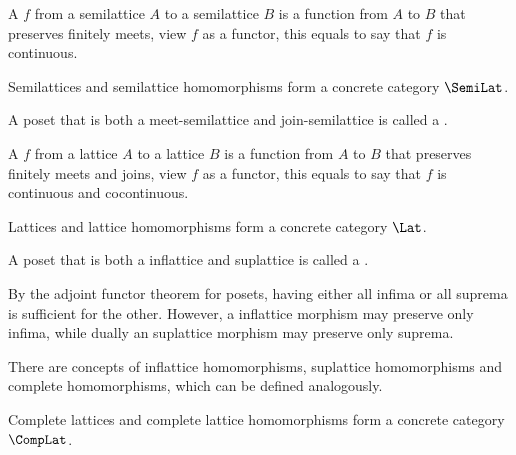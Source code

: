  A  $f$ from a semilattice $A$ to a semilattice $B$ is a function from $A$ to $B$ that preserves finitely meets, view $f$ as a functor, this equals to say that $f$ is continuous.

  Semilattices and semilattice homomorphisms form a concrete category $\SemiLat$.

  \begin{defn}
  A poset that is both a meet-semilattice and join-semilattice is called a .
  \end{defn}
  A  $f$ from a lattice $A$ to a lattice $B$ is a function from $A$ to $B$ that preserves finitely meets and joins, view $f$ as a functor, this equals to say that $f$ is continuous and cocontinuous.

  Lattices and lattice homomorphisms form a concrete category $\Lat$.

  \begin{defn}
  A poset that is both a inflattice and suplattice is called a .
  \end{defn}
  \begin{rem}
    By the adjoint functor theorem for posets, having either all infima or all suprema is sufficient for the other. However, a inflattice morphism may preserve only infima, while dually an suplattice morphism may preserve only suprema.
  \end{rem}
  There are concepts of inflattice homomorphisms, suplattice homomorphisms and complete homomorphisms, which can be defined analogously.

  Complete lattices and complete lattice homomorphisms form a concrete category $\CompLat$.


